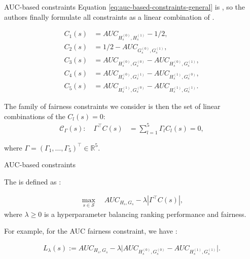 \begin{frame}{AUC-based constraints}
    Equation \ref{eq:auc-based-constraints-general} is , so the authors finally formulate all  constraints as a linear combination of .

    \vspace{-0.85cm} 
    \begin{align*}
        C_1(s) &= AUC_{H^{(0)}_s, H^{(1)}_s} - 1/2,\\
        C_2(s) &=   1/2 - AUC_{G^{(0)}_s, G^{(1)}_s},\\
        C_3(s) &= AUC_{H^{(0)}_s, G^{(0)}_s} - AUC_{H^{(0)}_s, G^{(1)}_s}, \\
        C_4(s) &= AUC_{H^{(0)}_s, G^{(1)}_s} - AUC_{H^{(1)}_s, G^{(0)}_s}, \\
        C_5(s) &= AUC_{H^{(1)}_s, G^{(0)}_s} - AUC_{H^{(1)}_s, G^{(1)}_s}.
    \end{align*}


    The family of fairness constraints we consider is then the set of linear
    combinations of the $C_l(s) = 0$:
    \begin{align}\label{eq:barycenter-constraint-formulation}
        \mathcal{C}_\Gamma(s): \quad \Gamma^\top C(s) &= \textstyle\sum_{l=1}^5
        \Gamma_l C_l (s) = 0,
    \end{align}

    where $\Gamma = (\Gamma_1 , \dots, \Gamma_5)^\top \in \mathbb{R}^5$.


\end{frame}


\begin{frame}{AUC-based constraints}
    
    The  is defined as : 

    \begin{align*}
        \label{eq:auc_general_problem}
            \max_{s\in\mathcal{S}} \quad AUC_{H_s,G_s} - \lambda |\Gamma^\top C(s)|,
    \end{align*}
    where $\lambda \ge 0$ is a hyperparameter balancing ranking performance and fairness.

    For example, for the  AUC fairness constraint, we have :

    \begin{align*}
        L_\lambda(s) := AUC_{H_s,G_s} - \lambda \big|AUC_{H^{(0)}_s, G^{(0)}_s} - AUC_{ H^{(1)}_s, G^{(1)}_s }\big|.
    \end{align*}

\end{frame}



